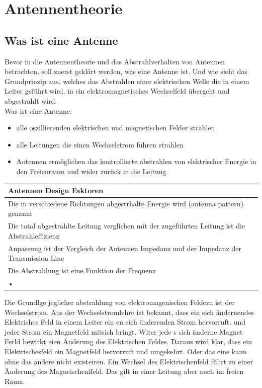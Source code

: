 \section{Antennentheorie}
\subsection{ Was ist eine Antenne}
Bevor in die Antennentheorie und das Abstrahlverhalten von Antennen betrachten, soll zuerst geklärt werden, was eine Antenne ist. Und wie sieht das Grundprinzip aus, welches das Abstrahlen einer elektrischen Welle die in einem Leiter geführt wird, in ein elektromagnetisches Wechselfeld übergeht und abgestrahlt wird. \\
Was ist eine Antenne:
\begin{itemize}
\item alle oszillierenden elektrischen und magnetischen Felder strahlen
\item alle Leitungen die einen Wechselstrom führen strahlen
\item Antennen ermöglichen das kontrollierte abstrahlen von elektrischer Energie in den Freienraum und wider zurück in die Leitung

\end{itemize}

\begin{tabular}{l}
\hline 
Antennen Design Faktoren \\ 
\hline 
Die in verschiedene Richtungen abgestrhalte Energie wird (antenna pattern) genannt\\ 
\hline 
Die total abgestrahlte Leitung verglichen mit der zugeführten Leitung ist die Abstrahleffizienz \\ 
\hline 
Anpassung ist der Vergleich der  Antennen Impedanz  und der Impedanz der Transmission Line\\ 
\hline 
Die Abstrahlung ist eine Funktion der Frequenz \\ 
\hline 
• \\ 
\hline 
\end{tabular} 

Die Grundlge jeglicher abstrahlung von elektromagenischen Feldern ist der Wechselstrom. Aus der Wechselstromlehre ist bekannt, dass ein sich ändernendes Elektrishes Feld in einem Leiter ein en sich änderenden Strom hervorruft. und jeder Strom ein Magnetfeld mitsich bringt. Witer jede s sich änderne Magnet Ferld bewirkt eien Änderung des Elektrischen Feldes. Daraus wird klar, dass ein Elektrischesfeld ein Magnetfeld  hervorruft und umgekehrt. Oder das eine kann ohne das andere nicht existeiren. Ein Wechsel des Elektrischenfeld führt zu einer Änderung des Magneischenffeld. Das gilt in einer Leitung aber auch im freien Raum.


